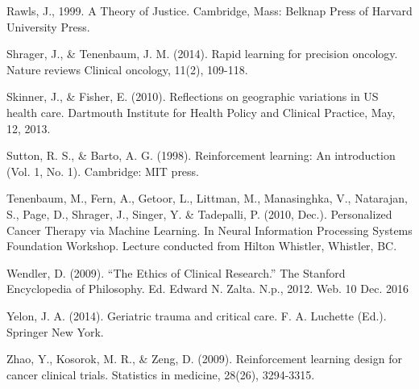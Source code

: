 \documentclass[]{spie}  %
\begin{document}
\skiplinehalf

\indent Rawls, J., 1999. A Theory of Justice. Cambridge, Mass: Belknap Press of Harvard University Press.

\skiplinehalf

\indent Shrager, J., & Tenenbaum, J. M. (2014). Rapid learning for precision oncology. Nature reviews Clinical oncology, 11(2), 109-118.

\skiplinehalf

\indent Skinner, J., & Fisher, E. (2010). Reflections on geographic variations in US health care. Dartmouth Institute for Health Policy and Clinical Practice, May, 12, 2013.

\skiplinehalf

\indent Sutton, R. S., & Barto, A. G. (1998). Reinforcement learning: An introduction (Vol. 1, No. 1). Cambridge: MIT press.

\skiplinehalf

\indent Tenenbaum, M., Fern, A., Getoor, L., Littman, M., Manasinghka, V., Natarajan, S., Page, D., Shrager, J., Singer, Y. & Tadepalli, P. (2010, Dec.). Personalized Cancer Therapy via Machine Learning. In Neural Information Processing Systems Foundation Workshop. Lecture conducted from Hilton Whistler, Whistler, BC.

\skiplinehalf

\indent Wendler, D. (2009). “The Ethics of Clinical Research.” The Stanford Encyclopedia of Philosophy. Ed. Edward N. Zalta. N.p., 2012. Web. 10 Dec. 2016

\skiplinehalf

\indent Yelon, J. A. (2014). Geriatric trauma and critical care. F. A. Luchette (Ed.). Springer New York.

\skiplinehalf

\indent Zhao, Y., Kosorok, M. R., & Zeng, D. (2009). Reinforcement learning design for cancer clinical trials. Statistics in medicine, 28(26), 3294-3315.
\end{document}
